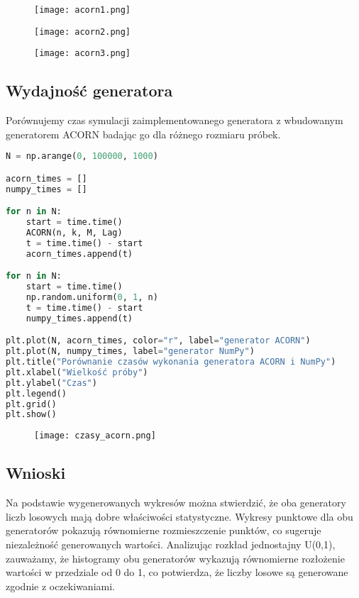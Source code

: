 \documentclass[12pt,letterpaper]{article}
\theoremstyle{definition}
\begin{document}
\begin{figure}[H]
			\centering

				\centering
				\texttt{[image: acorn1.png]}
				\label{fig:zdjecie1}
			\hfill
		\end{figure}

\begin{figure}[H]
			\centering

				\centering
				\texttt{[image: acorn2.png]}
				\label{fig:zdjecie1}
			\hfill
		\end{figure}

\begin{figure}[H]
			\centering

				\centering
				\texttt{[image: acorn3.png]}
				\label{fig:zdjecie1}
			\hfill
		\end{figure}


\subsection{Wydajność generatora}
Porównujemy czas symulacji zaimplementowanego generatora z wbudowanym generatorem ACORN badając go dla różnego rozmiaru próbek.
\begin{lstlisting}[language=Python, caption=Badanie wydajności generatora ACORN.]
N = np.arange(0, 100000, 1000)

acorn_times = []
numpy_times = []

for n in N:
    start = time.time()
    ACORN(n, k, M, Lag)
    t = time.time() - start
    acorn_times.append(t)

for n in N:
    start = time.time()
    np.random.uniform(0, 1, n)
    t = time.time() - start
    numpy_times.append(t)

plt.plot(N, acorn_times, color="r", label="generator ACORN")
plt.plot(N, numpy_times, label="generator NumPy")
plt.title("Porównanie czasów wykonania generatora ACORN i NumPy")
plt.xlabel("Wielkość próby")
plt.ylabel("Czas")
plt.legend()
plt.grid()
plt.show()
\end{lstlisting}

\begin{figure}[H]
			\centering

				\centering
				\texttt{[image: czasy\_acorn.png]}
				\label{fig:zdjecie1}
			\hfill
		\end{figure}

\subsection{Wnioski}
Na podstawie wygenerowanych wykresów można stwierdzić, że oba generatory liczb losowych mają dobre właściwości statystyczne. Wykresy punktowe dla obu generatorów pokazują równomierne rozmieszczenie punktów, co sugeruje niezależność generowanych wartości. Analizując rozkład jednostajny U(0,1), zauważamy, że histogramy obu generatorów wykazują równomierne rozłożenie wartości w przedziale od 0 do 1, co potwierdza, że liczby losowe są generowane zgodnie z oczekiwaniami. 
\end{document}
